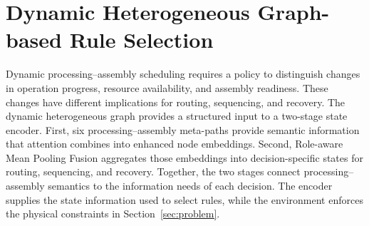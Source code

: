 \section{Dynamic Heterogeneous Graph-based Rule Selection}
\label{sec:method}

Dynamic processing--assembly scheduling requires a policy to distinguish changes in operation progress,
resource availability, and assembly readiness. These changes have different implications for routing,
sequencing, and recovery. The dynamic heterogeneous graph provides a structured input to a two-stage state encoder.
First, six processing--assembly meta-paths provide semantic information that attention combines
into enhanced node embeddings. Second, Role-aware Mean Pooling Fusion aggregates those embeddings
into decision-specific states for routing, sequencing, and recovery. Together, the two stages connect processing--assembly semantics to the information needs of each decision.
The encoder supplies the state information used to select rules, while the environment enforces
the physical constraints in Section~\ref{sec:problem}.


